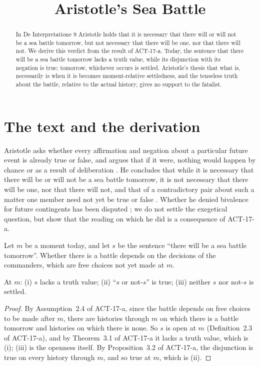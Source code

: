 \documentclass{situationist-preprint}
\title{Aristotle's Sea Battle}
\begin{document}
\maketitle

\begin{abstract}
In De Interpretatione 9 Aristotle holds that it is necessary that there will or will not be a sea battle tomorrow, but not necessary that there will be one, nor that there will not. We derive this verdict from the result of ACT-17-a. Today, the sentence that there will be a sea battle tomorrow lacks a truth value, while its disjunction with its negation is true; tomorrow, whichever occurs is settled. Aristotle's thesis that what is, necessarily is when it is becomes moment-relative settledness, and the tenseless truth about the battle, relative to the actual history, gives no support to the fatalist.
\end{abstract}

\section{The text and the derivation}

Aristotle asks whether every affirmation and negation about a particular future event is already true or false, and argues that if it were, nothing would happen by chance or as a result of deliberation \citep[ch.~9, 18b26--19a22]{AristotleDeInt}. He concludes that while it is necessary that there will be or will not be a sea battle tomorrow, it is not necessary that there will be one, nor that there will not, and that of a contradictory pair about such a matter one member need not yet be true or false \citep[19a30--19b4]{AristotleDeInt}. Whether he denied bivalence for future contingents has been disputed \citep{Anscombe1956}; we do not settle the exegetical question, but show that the reading on which he did is a consequence of ACT-17-a.

Let $m$ be a moment today, and let $s$ be the sentence \enquote{there will be a sea battle tomorrow}. Whether there is a battle depends on the decisions of the commanders, which are free choices not yet made at $m$.

\begin{proposition}\label{p:sea}
At $m$: (i) $s$ lacks a truth value; (ii) \enquote{$s$ or not-$s$} is true; (iii) neither $s$ nor not-$s$ is settled.
\end{proposition}

\begin{proof}
By Assumption~2.4 of ACT-17-a, since the battle depends on free choices to be made after $m$, there are histories through $m$ on which there is a battle tomorrow and histories on which there is none. So $s$ is open at $m$ (Definition~2.3 of ACT-17-a), and by Theorem~3.1 of ACT-17-a it lacks a truth value, which is (i); (iii) is the openness itself. By Proposition~3.2 of ACT-17-a, the disjunction is true on every history through $m$, and so true at $m$, which is (ii).
\end{proof}
\end{document}
